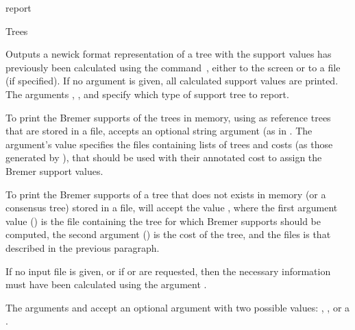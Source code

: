 \begin{command}{report}{}
\begin{arguments}
\begin{argumentgroup}{Trees}
                {Outputs a newick format representation of a tree with the
                support values has previously been calculated using the
                command~,
                either to the screen or to a file (if specified). If no argument
                is given, all calculated support values are printed. The arguments
                , , and
                 specify which type of support tree to
                report. 
            
                \indent To print the Bremer supports of the trees in memory, using as
                reference trees that are stored in a file,  accepts
                an optional string argument (as in .
                The argument's value specifies the files containing lists of
                trees and costs (as those generated by ), that
                should be used with their annotated cost to assign the Bremer
                support values.  

                \indent To print the Bremer supports of a tree that does not exists in
                memory (or a consensus tree) stored in a file,
                 will accept the value
                , where the
                first argument value (\poystring) is the file containing the tree for which
                Bremer supports should be computed, the second argument (\poyint) is the
                cost of the tree, and the files is that described in the
                previous paragraph.

                If no input file is given, or if  or
                 are requested, then the necessary
                information must have been calculated using the argument 
                .
            
                The arguments  and  accept an
                optional argument with two possible values:
                , , or a
                \poystring.

}
\end{argumentgroup}
\end{arguments}
\end{command}
